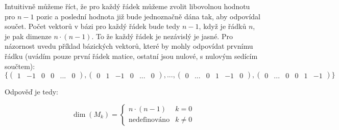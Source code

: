 \documentclass[10pt,a4paper]{article}
\begin{document}
Intuitivně můžeme říct, že pro každý řádek můžeme zvolit libovolnou hodnotu pro $n-1$ pozic a poslední hodnota již bude jednoznačně dána tak, aby odpovídal součet. Počet vektorů v bázi pro každý řádek bude tedy $n-1$, když je řádků $n$, je pak dimenze $n\cdot (n-1)$. To že každý řádek je nezávislý je jasné. Pro názornost uvedu příklad bázických vektorů, které by mohly odpovídat prvnímu řádku (uvádím pouze první řádek matice, ostatní jsou nulové, s nulovým sedícím součtem): 
\begin{equation*}
\{
\begin{pmatrix} 1 & -1 & 0 & 0 & ... & 0 \end{pmatrix},
\begin{pmatrix} 0 & 1 & -1 & 0 & ... & 0 \end{pmatrix},
...,
\begin{pmatrix} 0 & ... & 0 & 1 & -1& 0 \end{pmatrix}, \begin{pmatrix} 0 & ... & 0 & 0 & 1 & -1 \end{pmatrix} 
\}
\end{equation*}

Odpověď je tedy:

\begin{equation*}
\dim(M_k) = \begin{cases}
n\cdot(n-1) & k = 0 \\
\text{nedefinováno} & k \neq 0
\end{cases}
\end{equation*}

\pagebreak
\end{document}
